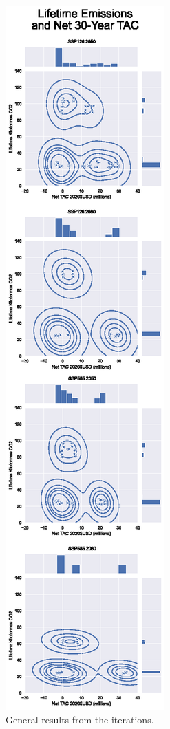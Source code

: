 \documentclass[twocolumn, a4paper,10pt]{article}
\begin{document}
\begin{figure}[hbpt]
    \centering
    \includegraphics[scale=1.0]{figures/general_results.eps}
    \caption{General results from the iterations.}
    \label{fig:joint_plot}
\end{figure}
\end{document}
